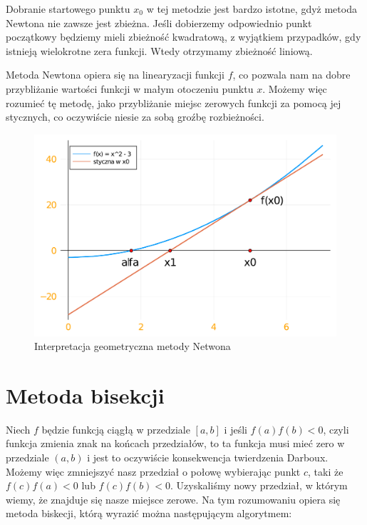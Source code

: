 \documentclass[a4paper]{article}
\begin{document}
    Dobranie startowego punktu $x_0$ w tej metodzie jest bardzo istotne, gdyż metoda Newtona nie zawsze jest zbieżna.
    Jeśli dobierzemy odpowiednio punkt początkowy będziemy mieli zbieżność kwadratową, z wyjątkiem przypadków, gdy 
    istnieją wielokrotne zera funkcji. Wtedy otrzymamy zbieżność liniową.

    \vspace{5mm}

    Metoda Newtona opiera się na linearyzacji funkcji $f$, co pozwala nam na dobre przybliżanie wartości funkcji w małym
    otoczeniu punktu $x$. Możemy więc rozumieć tę metodę, jako przybliżanie miejsc zerowych funkcji za pomocą jej stycznych,
    co oczywiście niesie za sobą groźbę rozbieżności.

    \vspace{10mm}

    \begin{figure}[h]
        \centering
        \includegraphics[width=12cm]{newtonPlot}
        \caption{Interpretacja geometryczna metody Netwona}
    \end{figure}

\newpage
\section{Metoda bisekcji}
    Niech $f$ będzie funkcją ciągłą w przedziale $[a,b]$ i jeśli $f(a)f(b) < 0$, czyli funkcja zmienia znak na końcach przedziałów, to
    ta funkcja musi mieć zero w przedziale $(a,b)$ i jest to oczywiście konsekwencja twierdzenia Darboux. Możemy więc zmniejszyć nasz
    przedział o połowę wybierając punkt $c$, taki że $f(c)f(a) < 0$ lub $f(c)f(b) < 0$. Uzyskaliśmy nowy przedział, w którym wiemy, że
    znajduje się nasze miejsce zerowe. Na tym rozumowaniu opiera się metoda biskecji, którą wyrazić można następującym algorytmem:
\end{document}
